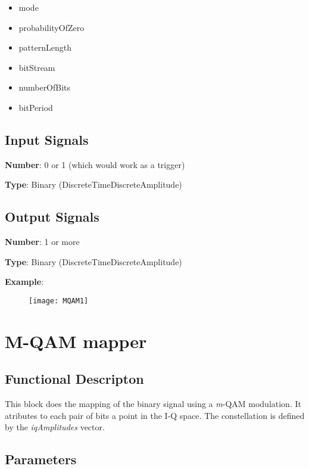 \documentclass[a4paper]{article}
\begin{document}
\begin{multicols}{2}
	\begin{itemize}
		\item mode
		\item probabilityOfZero 
		\item patternLength 
		\item bitStream 
		\item numberOfBits 
		\item bitPeriod 
	\end{itemize}
\end{multicols}

\subsection*{Input Signals}

\textbf{Number}: 0 or 1 (which would work as a trigger)

\textbf{Type}: Binary (DiscreteTimeDiscreteAmplitude)

\subsection*{Output Signals}

\textbf{Number}: 1 or more

\textbf{Type}: Binary (DiscreteTimeDiscreteAmplitude)

\textbf{Example}:

\begin{figure}
	\texttt{[image: MQAM1]}
\end{figure}


\pagebreak

\section{M-QAM mapper}

\subsection*{Functional Descripton}

This block does the mapping of the binary signal using a \textit{m}-QAM modulation. It atributes to each pair of bits a point in the I-Q space. The constellation is defined by the \textit{iqAmplitudes} vector.

\subsection*{Parameters}
\end{document}
